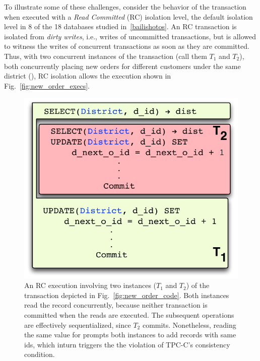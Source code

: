 To illustrate some of these challenges, consider the behavior of the
 transaction when executed with a \emph{Read Committed}
(RC) isolation level, the default isolation level in 8 of the 18
databases studied in~\ref{bailishotos}.  An RC transaction is
isolated from \emph{dirty writes}, i.e., writes of uncommitted
transactions, but is allowed to witness the writes of concurrent
transactions as soon as they are committed. Thus, with two concurrent
instances of the  transaction (call them $T_1$ and
$T_2$), both concurrently placing new orders for different customers
under the same district (), RC isolation allows the
execution shown in Fig.~\ref{fig:new_order_execs}.

\begin{figure}[!t]
\includegraphics[scale=0.45]{Figures/motiv-eg-1-b}
\caption{\small An RC execution involving two instances ($T_1$ and
  $T_2$) of the  transaction depicted in
  Fig.~\ref{fig:new_order_code}. 
  Both instances read the   record concurrently,
  because neither transaction is committed when the reads are
  executed.  The subsequent operations are effectively sequentialized,
  since $T_2$ commits. Nonetheless, reading the same value for
   prompts both instances to add  records
  with same ids, which inturn triggers the the violation of TPC-C's
  consistency condition.}
\label{fig:new_order_exec}
\end{figure}

